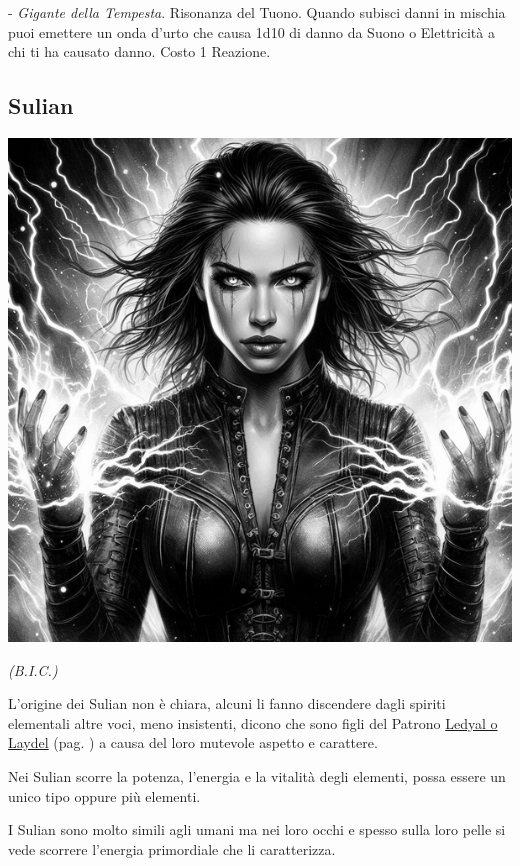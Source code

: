 \begin{multicols}{2}
- \emph{Gigante della Tempesta}. Risonanza del Tuono. Quando subisci danni in mischia puoi emettere un onda d'urto che causa 1d10 di danno da Suono o Elettricità a chi ti ha causato danno. Costo 1 Reazione.

\subsection{Sulian}\label{sulian}\hypertarget{sulian}{}

\begin{center}

\includegraphics[width=0.7\linewidth]{immagini/sulian4-ai.png}

\textit{(B.I.C.)}

\end{center}

%

L'origine dei Sulian non è chiara, alcuni li fanno discendere dagli spiriti elementali altre voci, meno insistenti, dicono che sono figli del Patrono \hyperlink{ledyal}{Ledyal o Laydel} (pag. \pageref{ledyal}) a causa del loro mutevole aspetto e carattere.

Nei Sulian scorre la potenza, l'energia e la vitalità degli elementi, possa essere un unico tipo oppure più elementi.

I Sulian sono molto simili agli umani ma nei loro occhi e spesso sulla loro pelle si vede scorrere l'energia primordiale che li caratterizza.


\end{multicols}
